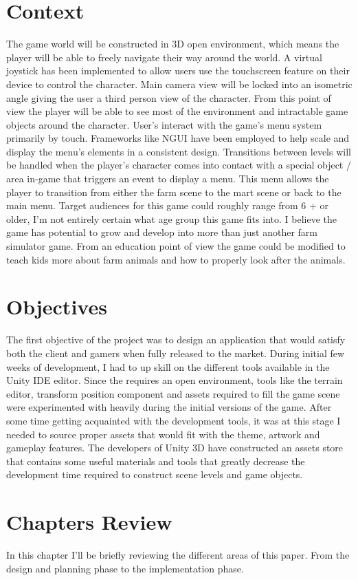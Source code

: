\section{Context}
The game world will be constructed in 3D open environment, which means the player will be able to freely navigate their way around the world. A virtual joystick has been implemented to allow users use the touchscreen feature on their device to control the character. Main camera view will be locked into an isometric angle giving the user a third person view of the character. From this point of view the player will be able to see most of the environment and intractable game objects around the character. User's interact with the game's menu system primarily by touch. Frameworks like NGUI have been employed to help scale and display the menu's elements in a consistent design. Transitions between levels will be handled when the player’s character comes into contact with a special object / area in-game that triggers an event to display a menu. This menu allows the player to transition from either the farm scene to the mart scene or back to the main menu. Target audiences for this game could roughly range from 6 + or older, I'm not entirely certain what age group this game fits into. I believe the game has potential to grow and develop into more than just another farm simulator game. From an education point of view the game could be modified to teach kids more about farm animals and how to properly look after the animals.

\section{Objectives}
The first objective of the project was to design an application that would satisfy both the client and gamers when fully released to the market. During initial few weeks of development, I had to up skill on the different tools available in the Unity IDE editor. Since the requires an open environment, tools like the terrain editor, transform position component and assets required to fill the game scene were experimented with heavily during the initial versions of the game. 
After some time getting acquainted with the development tools, it was at this stage I needed to source proper assets that would fit with the theme, artwork and gameplay features. The developers of Unity 3D have constructed an assets store that contains some useful materials and tools that greatly decrease the development time required to construct scene levels and game objects.
\section{Chapters Review}
In this chapter I'll be briefly reviewing the different areas of this paper. From the design and planning phase to the implementation phase.
